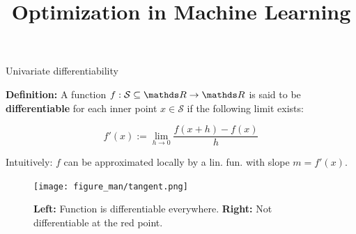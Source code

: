 \documentclass[11pt,compress,t,notes=noshow, xcolor=table]{beamer}
\title{Optimization in Machine Learning}
\begin{document}



\begin{vbframe}{Univariate differentiability}

\textbf{Definition:} A function $f: \mathcal{S} \subseteq \R \to \R$ is said to be \textbf{differentiable} for each inner point $x \in \mathcal{S}$ if the following limit exists:

$$
f'(x) := \lim_{h \to 0} \frac{f(x + h) - f(x)}{h}
$$

Intuitively: $f$ can be approximated locally by a lin. fun. with slope $m = f'(x)$.

\begin{figure}
    \centering
    \texttt{[image: figure\_man/tangent.png]}
    \caption*{\footnotesize \textbf{Left:} Function is differentiable everywhere.
        \textbf{Right:} Not differentiable at the red point. }
\end{figure}








\end{vbframe}
\end{document}
